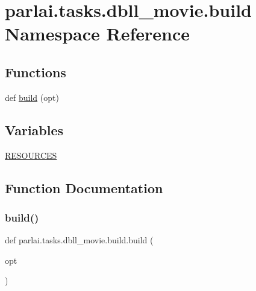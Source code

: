 \hypertarget{namespaceparlai_1_1tasks_1_1dbll__movie_1_1build}{}\section{parlai.\+tasks.\+dbll\+\_\+movie.\+build Namespace Reference}
\label{namespaceparlai_1_1tasks_1_1dbll__movie_1_1build}
\subsection*{Functions}
\begin{DoxyCompactItemize}
\item 
def \hyperlink{namespaceparlai_1_1tasks_1_1dbll__movie_1_1build_a5e884d505c1311a6afaaf8a587e4708f}{build} (opt)
\end{DoxyCompactItemize}
\subsection*{Variables}
\begin{DoxyCompactItemize}
\item 
\hyperlink{namespaceparlai_1_1tasks_1_1dbll__movie_1_1build_a16c744c36b8666d1a259b20627e33872}{R\+E\+S\+O\+U\+R\+C\+ES}
\end{DoxyCompactItemize}


\subsection{Function Documentation}
\mbox{\label{namespaceparlai_1_1tasks_1_1dbll__movie_1_1build_a5e884d505c1311a6afaaf8a587e4708f}} 
\subsubsection{\texorpdfstring{build()}{build()}}
{\footnotesize\ttfamily def parlai.\+tasks.\+dbll\+\_\+movie.\+build.\+build (\begin{DoxyParamCaption}\item[{}]{opt }\end{DoxyParamCaption})}



